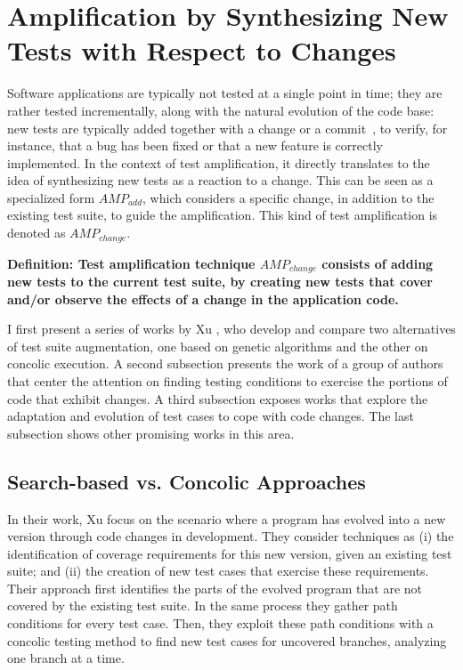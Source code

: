 \section{Amplification by Synthesizing New Tests with Respect to Changes}
\label{sec:sota:category-2}

Software applications are typically not tested at a single point in time; they are rather tested incrementally, along with the natural evolution of the code base: 
new tests are typically added together with a change or a commit~\cite{azaidmanEMSE2011,DBLP:conf/icst/ZaidmanRDD08}, to verify, for instance, that a bug has been fixed or that a new feature is correctly implemented. 
In the context of test amplification, it directly translates to the idea of synthesizing new tests as a reaction to a change. 
This can be seen as a specialized form $AMP_{add}$, which considers a specific change, in addition to the existing test suite, to guide the amplification.
This kind of test amplification is denoted as $AMP_{change}$. 

\medskip
\textbf{Definition: Test amplification technique $AMP_{change}$ consists of adding new tests to the current test suite, by creating new tests that cover and/or observe the effects of a change in the application code.}

I first present a series of works by Xu \etal, who develop and compare two alternatives of test suite augmentation, one based on genetic algorithms and the other on concolic execution. 
A second subsection presents the work of a group of authors that center the attention on finding testing conditions to exercise the portions of code that exhibit changes. 
A third subsection exposes works that explore the adaptation and evolution of test cases to cope with code changes. 
The last subsection shows other promising works in this area.

\subsection{Search-based vs. Concolic Approaches}
\label{subsec:sota:category-2:search-based-vs-concolic}

In their work, Xu \etal\cite{xu2009directed} focus on the scenario where a program has evolved into a new version through code changes in development. 
They consider techniques as 
(i) the identification of coverage requirements for this new version, given an existing test suite;
and (ii) the creation of new test cases that exercise these requirements. 
Their approach first identifies the parts of the evolved program that are not covered by the existing test suite. 
In the same process they gather path conditions for every test case. 
Then, they exploit these path conditions with a concolic testing method to find new test cases for uncovered branches, analyzing one branch at a time.

